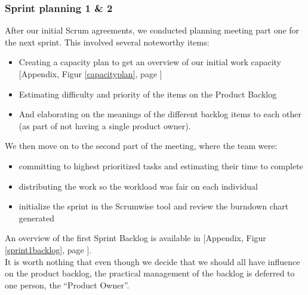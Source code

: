 \subsubsection{Sprint planning 1 \& 2}
After our initial Scrum agreements, we conducted planning meeting part one for the next sprint. This involved several noteworthy items:
\begin{itemize}
\item Creating a capacity plan to get an overview of our initial work capacity [Appendix, Figur \ref{capacityplan}, page \pageref{capacityplan}]
\item Estimating difficulty and priority of the items on the Product Backlog
\item And elaborating on the meanings of the different backlog items to each other (as part of not having a single product owner).
\end{itemize}
We then move on to the second part of the meeting, where the team were:
\begin{itemize}
\item committing to highest prioritized tasks and estimating their time to complete
\item distributing the work so the workload was fair on each individual
\item initialize the sprint in the Scrumwise tool and review the burndown chart generated
\end{itemize}
An overview of the first Sprint Backlog is available in [Appendix, Figur \ref{sprint1backlog}, page \pageref{sprint1backlog}].\\
It is worth nothing that even though we decide that we should all have influence on the product backlog, the practical management of the backlog is deferred to one person, the “Product Owner”.\\


\newpage